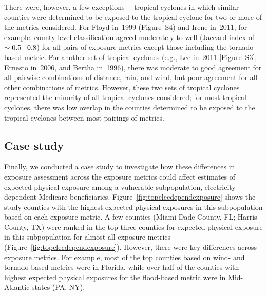 \begin{comment}
Storms are displayed within
clusters that have similar patterns in county-level exposure agreement for
metric pairs, based on hierarchical clustering using the complete link
method~\parencite{murtagh2012algorithms} (i.e., storms in the same cluster tend
to have similar patterns for the pairwise strength of agreement among metrics);
columns are also ordered based on hierarchical clustering. 
Maps are
available showing the counties identified as exposed under each of five metrics
for the widest-extent storm in each cluster: Hurricane Ivan in~2004
(Figure~\ref{fig:ivanexposure}) and Hurricanes Floyd in~1999, Lee in~2011, Cindy
in~2005, and Katrina in~2005 (Figure~S4).
\end{comment}

There were, however, a few exceptions\,---\,tropical cyclones in which similar
counties were determined to be exposed to the tropical cyclone for two or more
of the metrics considered.  For Floyd in~1999 (Figure~S4) and Irene in~2011,
for example, county-level classification agreed moderately to well (Jaccard
index of~$\sim 0.5\mbox{\,--\,}0.8$) for all pairs of exposure metrics except
those including the tornado-based metric. For another set of tropical cyclones
(e.g., Lee in~2011 [Figure~S3], Ernesto in~2006, and Bertha in~1996), there was
moderate to good agreement for all pairwise combinations of distance, rain, and
wind, but poor agreement for all other combinations of metrics. However, these
two sets of tropical cyclones represented the minority of all tropical cyclones
considered; for most tropical cyclones, there was low overlap in the counties
determined to be exposed to the tropical cyclones between most pairings of
metrics.

\subsection*{Case study}

Finally, we conducted a case study to investigate how these differences in
exposure assessment across the exposure metrics could affect estimates of
expected physical exposure among a vulnerable subpopulation,
electricity-dependent Medicare beneficiaries.
Figure~\ref{fig:topelecdependexposure} shows the study counties with the
highest expected physical exposures in this subpopulation based on each
exposure metric. A few counties (Miami-Dade County, FL; Harris County, TX) were
ranked in the top three counties for expected physical exposure in this
subpopulation for almost all exposure metrics
(Figure~\ref{fig:topelecdependexposure}). However, there were key differences
across exposure metrics. For example, most of the top counties based on wind-
and tornado-based metrics were in Florida, while over half of the counties with
highest expected physical exposures for the flood-based metric were in
Mid-Atlantic states (PA, NY).



